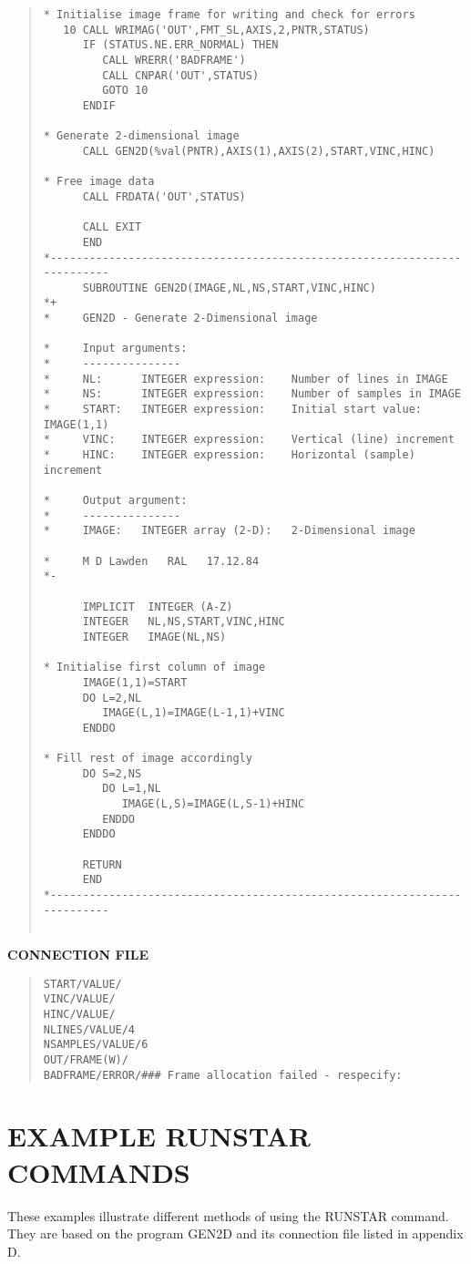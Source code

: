 \begin{quote}
\begin{verbatim}
* Initialise image frame for writing and check for errors
   10 CALL WRIMAG('OUT',FMT_SL,AXIS,2,PNTR,STATUS)
      IF (STATUS.NE.ERR_NORMAL) THEN
         CALL WRERR('BADFRAME')
         CALL CNPAR('OUT',STATUS)
         GOTO 10
      ENDIF

* Generate 2-dimensional image
      CALL GEN2D(%val(PNTR),AXIS(1),AXIS(2),START,VINC,HINC)

* Free image data
      CALL FRDATA('OUT',STATUS)

      CALL EXIT
      END
*-------------------------------------------------------------------------
      SUBROUTINE GEN2D(IMAGE,NL,NS,START,VINC,HINC)
*+
*     GEN2D - Generate 2-Dimensional image

*     Input arguments:
*     ---------------
*     NL:      INTEGER expression:    Number of lines in IMAGE
*     NS:      INTEGER expression:    Number of samples in IMAGE
*     START:   INTEGER expression:    Initial start value: IMAGE(1,1)
*     VINC:    INTEGER expression:    Vertical (line) increment
*     HINC:    INTEGER expression:    Horizontal (sample) increment

*     Output argument:
*     ---------------
*     IMAGE:   INTEGER array (2-D):   2-Dimensional image

*     M D Lawden   RAL   17.12.84
*-

      IMPLICIT  INTEGER (A-Z)
      INTEGER   NL,NS,START,VINC,HINC
      INTEGER   IMAGE(NL,NS)

* Initialise first column of image
      IMAGE(1,1)=START
      DO L=2,NL
         IMAGE(L,1)=IMAGE(L-1,1)+VINC
      ENDDO

* Fill rest of image accordingly
      DO S=2,NS
         DO L=1,NL
            IMAGE(L,S)=IMAGE(L,S-1)+HINC
         ENDDO
      ENDDO

      RETURN
      END
*-------------------------------------------------------------------------


\end{verbatim}
\end{quote}
\begin{center}
{\bf CONNECTION FILE}
\end{center}
\begin{quote}
\begin{verbatim}
START/VALUE/
VINC/VALUE/
HINC/VALUE/
NLINES/VALUE/4
NSAMPLES/VALUE/6
OUT/FRAME(W)/
BADFRAME/ERROR/### Frame allocation failed - respecify:
\end{verbatim}
\end{quote}
\section {EXAMPLE RUNSTAR COMMANDS}
These examples illustrate different methods of using the RUNSTAR command.
They are based on the program GEN2D and its connection file listed in appendix
D.
